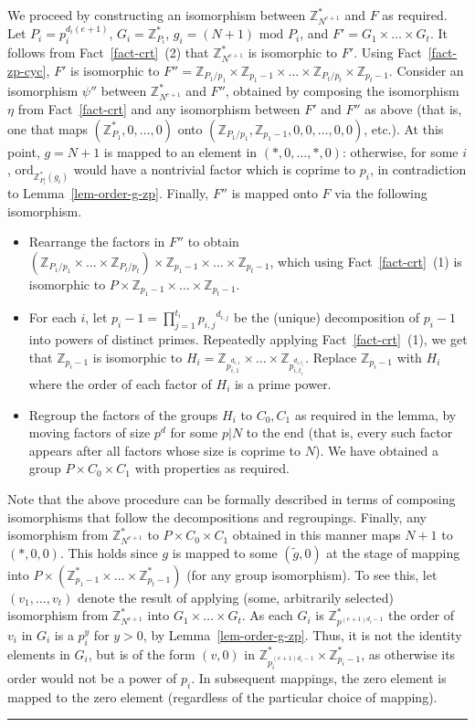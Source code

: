 \documentclass[11pt]{article}
\newenvironment{proof}{\noindent {\bf Proof:} \hspace{.677em}}%
                     {\qed}
\newcommand{\qed}{\hspace*{\fill}\rule{0.6em}{0.6em}}
\newcommand{\Z}{\mathbb{Z}}
\newcommand{\U}[1]{\mathbb{Z}_{#1}^*}
\newcommand{\opbrange}[3][,]{#2#1\ldots#1#3}
\newcommand{\order}{{\mathrm{ord}}}
\renewcommand{\mod}{{\,\,\mathrm{mod}\,\,}}
\begin{document}
\begin{proof}
We proceed by constructing an isomorphism between $\U{N^{e+1}}$ and
$F$ as required. Let $P_i=p^{d_i(e+1)}_i$, $G_i=\U{P_i}$,
$g_i=(N+1)\mod P_i$, and $F'=\opbrange[\times]{G_1}{G_t}$. It
follows from Fact~\ref{fact-crt}~(2) that $\U{N^{e+1}}$ is
isomorphic to $F'$. Using Fact~\ref{fact-zp-cyc}, $F'$ is
isomorphic to $F''=\opbrange[\times]{\Z_{P_1/p_1}\times
\Z_{p_1-1}}{\Z_{P_t/p_t}\times{\Z_{p_t-1}}}$. Consider an
isomorphism $\psi''$ between $\U{N^{e+1}}$ and $F''$, obtained by
composing the isomorphism $\eta$ from Fact~\ref{fact-crt} and any
isomorphism between $F'$ and $F''$ as above (that is, one that maps
$(\U{P_1},\opbrange{0}{0})$ onto
$(\Z_{P_1/p_1},\Z_{p_1-1},\opbrange{0,0}{0,0})$, etc.). At this
point, $g=N+1$ is mapped to an element in $(\opbrange{*,0}{*,0})$:
otherwise, for some $i$, $\order_{\U{P_i}(g_i)}$ would have a
nontrivial factor which is coprime to $p_i$, in contradiction to
Lemma~\ref{lem-order-g-zp}. Finally, $F''$ is mapped onto $F$ via
the following isomorphism.
\begin{itemize}
\item Rearrange the factors in $F''$ to obtain
$(\opbrange[\times]{\Z_{P_1/p_1}}{\Z_{P_t/p_t}})
\times\opbrange[\times]{\Z_{p_1-1}}{\Z_{p_t-1}}$, which using
Fact~\ref{fact-crt}~(1) is isomorphic to
$P\times\opbrange[\times]{\Z_{p_1-1}}{\Z_{p_t-1}}$.
\item  For each $i$, let $p_i-1=\prod^{t_i}_{j=1}{p_{i,j}}^{d_{i,j}}$ be the
(unique) decomposition of $p_i-1$ into powers of distinct primes.
Repeatedly applying Fact~\ref{fact-crt}~(1), we get that
$\Z_{p_i-1}$ is isomorphic to
$H_i=\opbrange[\times]{\Z_{p^{d_{i,1}}_{i,1}}}{\Z_{p^{d_{i,t_i}}_{i,t_i}}}$.
Replace $\Z_{p_i-1}$ with $H_i$ where the order of each factor
of $H_i$ is a prime power.
\item Regroup the factors of the groups $H_i$ to $C_0,C_1$
as required in the lemma, by moving factors of size $p^d$ for some
$p|N$ to the end (that is, every such factor appears after all
factors whose size is coprime to $N$). We have obtained a group
$P\times C_0\times C_1$ with properties as required.
\end{itemize}
Note that the above procedure can be formally described in terms of
composing isomorphisms that follow the decompositions and
regroupings. Finally, any isomorphism from $\U{N^{e+1}}$ to
$P\times C_0\times C_1$ obtained in this manner maps $N+1$ to
$(*,0,0)$. This holds since $g$ is mapped to some $(\tilde{g}, 0)$
at the stage of mapping into $P \times (\U{p_1-1}\times \ldots\times \U{p_t -1})$ (for any group isomorphism). To see this, let $(v_1,\ldots,v_t)$ denote the result of applying (some, arbitrarily selected) isomorphism from
$\U{N^{e+1}}$ into $G_1\times \ldots\times G_t$. As each $G_i$ is
$\U{p^{(e+1)d_i-1}}$ the order of $v_i$ in $G_i$ is a $p^y_i$ for $y>0$, by Lemma~\ref{lem-order-g-zp}. Thus, it is not the identity elements in $G_i$,
but is of the form $(v, 0)$ in $\U{p^{(e+1)d_i-1}_i}\times\U{p_i-1}$, as otherwise its order would not be a power of $p_i$.
In subsequent mappings, the zero element is mapped to the zero element (regardless of the particular choice of mapping). 
\end{proof}
\end{document}
